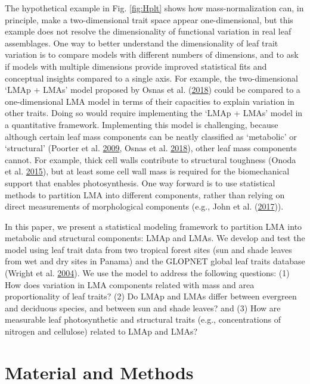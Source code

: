 \documentclass[
  12pt,
]{article}
\begin{document}
The hypothetical example in Fig. \ref{fig:Hplt} shows how mass-normalization can, in principle, make a two-dimensional trait space appear one-dimensional, but this example does not resolve the dimensionality of functional variation in real leaf assemblages.
One way to better understand the dimensionality of leaf trait variation is to compare models with different numbers of dimensions, and to ask if models with multiple dimensions provide improved statistical fits and conceptual insights compared to a single axis.
For example, the two-dimensional `LMAp + LMAs' model proposed by Osnas et al. (\protect\hyperlink{ref-Osnas2018}{2018}) could be compared to a one-dimensional LMA model in terms of their capacities to explain variation in other traits.
Doing so would require implementing the `LMAp + LMAs' model in a quantitative framework.
Implementing this model is challenging, because although certain leaf mass components can be neatly classified as `metabolic' or `structural' (Poorter et al. \protect\hyperlink{ref-Poorter2009}{2009}, Osnas et al. \protect\hyperlink{ref-Osnas2018}{2018}), other leaf mass components cannot.
For example, thick cell walls contribute to structural toughness (Onoda et al. \protect\hyperlink{ref-Onoda2015}{2015}), but at least some cell wall mass is required for the biomechanical support that enables photosynthesis.
One way forward is to use statistical methods to partition LMA into different components, rather than relying on direct measurements of morphological components (e.g., John et al. (\protect\hyperlink{ref-John2017}{2017})).

In this paper, we present a statistical modeling framework to partition LMA into metabolic and structural components: LMAp and LMAs.
We develop and test the model using leaf trait data from two tropical forest sites (sun and shade leaves from wet and dry sites in Panama) and the GLOPNET global leaf traits database (Wright et al. \protect\hyperlink{ref-Wright2004a}{2004}).
We use the model to address the following questions: (1) How does variation in LMA components related with mass and area proportionality of leaf traits? (2) Do LMAp and LMAs differ between evergreen and deciduous species, and between sun and shade leaves? and (3) How are measurable leaf photosynthetic and structural traits (e.g., concentrations of nitrogen and cellulose) related to LMAp and LMAs?

\hypertarget{material-and-methods}{%
\section{Material and Methods}\label{material-and-methods}}
\end{document}
